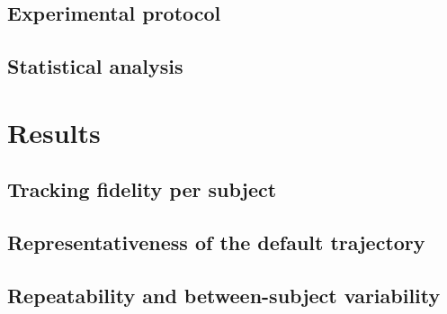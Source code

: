 \documentclass[times,sagev]{sagej}
\begin{document}
\subsection{Experimental protocol}

\subsection{Statistical analysis}

\section{Results}

\subsection{Tracking fidelity per subject}

\subsection{Representativeness of the default trajectory}

\subsection{Repeatability and between-subject variability}
\end{document}

